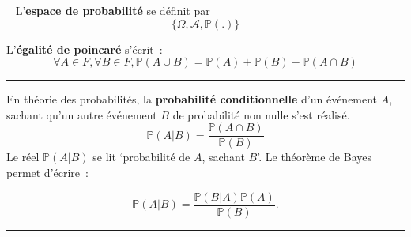 \begin{f}[Axiomatique]{\ }
	L'\textbf{espace de probabilité} se définit par 
	\[ \lbrace \Omega, \mathcal{A}, \mathbb{P}(.) \rbrace \]
	
	L'\textbf{égalité de poincaré} s'écrit~:
	\[\forall A \in F, \forall B \in F, \mathbb{P} (A \cup B) = \mathbb{P} (A) + \mathbb{P} (B) - \mathbb{P} (A \cap B)\]
	
\end{f}
\hrule

\begin{f}[Bayes]
	En théorie des probabilités, la \textbf{probabilité conditionnelle} d'un événement \(A\), sachant qu'un autre événement \(B\) de probabilité non nulle s'est réalisé.
	\[
	\mathbb{P}(A|B) = \frac{\mathbb{P}(A \cap B)}{\mathbb{P}(B)}
	\]
	Le réel \(\mathbb{P}(A|B)\) se lit `probabilité de \(A\), sachant \(B\)'.
	Le théorème de Bayes permet d'écrire~:
	
	\[   \mathbb{P}(A|B) = \frac{\mathbb{P}(B|A)\mathbb{P}(A)}{\mathbb{P}(B)}. \]
\end{f}
\hrule

